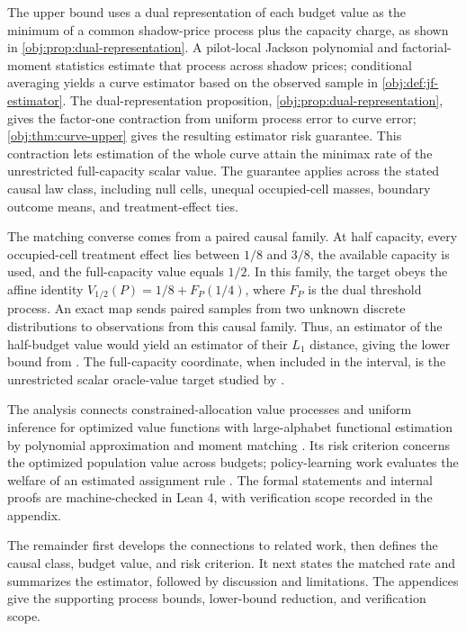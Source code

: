 \documentclass[11pt]{article}
\begin{document}
The upper bound uses a dual representation of each budget value as the minimum of a common shadow-price process plus the capacity charge, as shown in \cref{obj:prop:dual-representation}. A pilot-local Jackson polynomial and factorial-moment statistics estimate that process across shadow prices; conditional averaging yields a curve estimator based on the observed sample in \cref{obj:def:jf-estimator}. The dual-representation proposition, \cref{obj:prop:dual-representation}, gives the factor-one contraction from uniform process error to curve error; \cref{obj:thm:curve-upper} gives the resulting estimator risk guarantee. This contraction lets estimation of the whole curve attain the minimax rate of the unrestricted full-capacity scalar value. The guarantee applies across the stated causal law class, including null cells, unequal occupied-cell masses, boundary outcome means, and treatment-effect ties.

The matching converse comes from a paired causal family. At half capacity, every occupied-cell treatment effect lies between \(1/8\) and \(3/8\), the available capacity is used, and the full-capacity value equals \(1/2\). In this family, the target obeys the affine identity \(V_{1/2}(P)=1/8+F_P(1/4)\), where \(F_P\) is the dual threshold process. An exact map sends paired samples from two unknown discrete distributions to observations from this causal family. Thus, an estimator of the half-budget value would yield an estimator of their \(L_1\) distance, giving the lower bound from \citet[Theorem 3 and the unknown-both-distributions reduction following Theorem 6]{JiaoHanWeissman2018}. The full-capacity coordinate, when included in the interval, is the unrestricted scalar oracle-value target studied by \citet{CausalSmithUnrestricted2026}.

The analysis connects constrained-allocation value processes \citep[Section 4 and Theorem 4.1.1]{FengHongNekipelov2026} and uniform inference for optimized value functions \citep{FirpoGalvaoParker2023} with large-alphabet functional estimation by polynomial approximation and moment matching \citep{JiaoVenkatHanWeissman2015,CaiLow2011}. Its risk criterion concerns the optimized population value across budgets; policy-learning work evaluates the welfare of an estimated assignment rule \citep{KitagawaTetenov2018,AtheyWager2021,Pellatt2023}. The formal statements and internal proofs are machine-checked in Lean 4, with verification scope recorded in the appendix.

The remainder first develops the connections to related work, then defines the causal class, budget value, and risk criterion. It next states the matched rate and summarizes the estimator, followed by discussion and limitations. The appendices give the supporting process bounds, lower-bound reduction, and verification scope.
\end{document}
